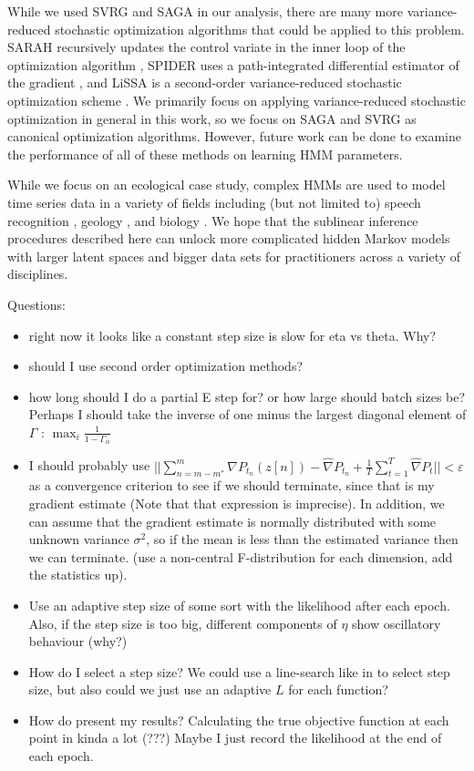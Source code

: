 While we used SVRG and SAGA in our analysis, there are many more variance-reduced stochastic optimization algorithms that could be applied to this problem. SARAH recursively updates the control variate in the inner loop of the optimization algorithm \citep{Nguyen:2017}, SPIDER uses a path-integrated differential estimator of the gradient \citep{Fang:2018}, and LiSSA is a second-order variance-reduced stochastic optimization scheme \citep{Agarwal:2017}. We primarily focus on applying variance-reduced stochastic optimization in general in this work, so we focus on SAGA and SVRG as canonical optimization algorithms. However, future work can be done to examine the performance of all of these methods on learning HMM parameters.

While we focus on an ecological case study, complex HMMs are used to model time series data in a variety of fields including (but not limited to) speech recognition \citep{Gales:2008}, geology \citep{Bebbington:2007}, and biology \citep{Yoon:2009}. We hope that the sublinear inference procedures described here can unlock more complicated hidden Markov models with larger latent spaces and bigger data sets for practitioners across a variety of disciplines.

\iffalse

Questions:

\begin{itemize}
    \item right now it looks like a constant step size is slow for eta vs theta. Why?
    \item should I use second order optimization methods?
    \item how long should I do a partial E step for? or how large should batch sizes be? Perhaps I should take the inverse of one minus the largest diagonal element of $\Gamma$ : $\max_i \frac{1}{1-\Gamma_{ii}}$
    \item I should probably use $||\sum_{n=m-m^*}^{m} \nabla P_{t_n}(z[n]) - \widehat \nabla P_{t_n} + \frac{1}{T} \sum_{t=1}^T \widehat \nabla P_t|| < \varepsilon$ as a convergence criterion to see if we should terminate, since that is my gradient estimate (Note that that expression is imprecise). In addition, we can assume that the gradient estimate is normally distributed with some unknown variance $\sigma^2$, so if the mean is less than the estimated variance then we can terminate. (use a non-central F-distribution for each dimension, add the statistics up).
    \item Use an adaptive step size of some sort with the likelihood after each epoch. Also, if the step size is too big, different components of $\eta$ show oscillatory behaviour (why?)
    \item How do I select a step size? We could use a line-search like in \citep{Schmidt:2017} to select step size, but also could we just use an adaptive $L$ for each function?  
    \item How do present my results? Calculating the true objective function at each point in kinda a lot (???) Maybe I just record the likelihood at the end of each epoch.
\end{itemize}

